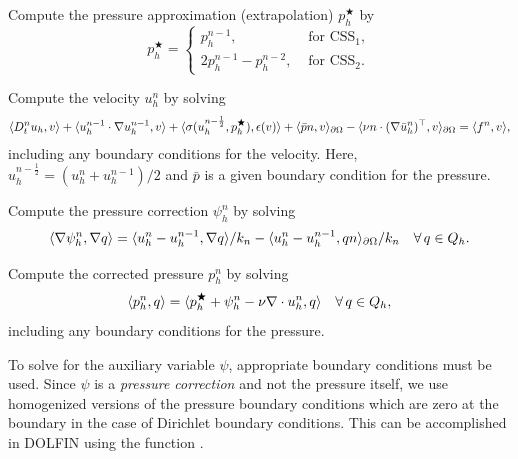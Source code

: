 {
\item
  Compute the pressure approximation (extrapolation)
  $p_h^{\bigstar}$ by
  \begin{equation}\label{eq:css,1a}
    p_h^{\bigstar} =
    \left\{
    \begin{array}{ll}
      p_h^{n-1}, & \mbox{ for } \mathrm{CSS}_1, \\
      2 p_h^{n-1} - p_h^{n-2}, & \mbox{ for } \mathrm{CSS}_2.
    \end{array}
    \right.
  \end{equation}

\item
  Compute the velocity $u_h^n$ by solving
  \begin{equation}\label{eq:css,2}
    \begin{split}
      \renni{v}{D_t^n u_h}
      + \renni{v}{u_h^{n-1} \cdot \nabla u_h^{n-1}}
      + \renni{\epsilon(v)}{\sigma(u^{n-\frac{1}{2}}_h, p_h^{\bigstar})}
      + \renni{v}{\bar{p} n}_{\partial\Omega}
      - \renni{v}{\nu n \cdot (\nabla \bar{u}_h^n)^{\top}}_{\partial\Omega}
      = \renni{v}{f^n},
    \end{split}
  \end{equation}
  including any boundary conditions for the velocity. Here,
  $u^{n-\frac{1}{2}}_h = (u_h^n + u_h^{n-1}) / 2$ and $\bar{p}$ is a given
  boundary condition for the pressure.

\item
  Compute the pressure correction $\psi_h^n$ by solving
  \begin{equation}\label{eq:css,3}
    \renni{\nabla q}{\nabla \psi_h^n}
    = \renni{\nabla q}{u_h^n - u_h^{n-1}} / k_n
    - \renni{qn}{u_h^n - u_h^{n-1}}_{\partial\Omega} / k_n
    \quad \foralls q \in Q_h.
  \end{equation}

\item
  Compute the corrected pressure $p_h^n$ by solving
  \begin{equation}\label{eq:css,4}
    \renni{q}{p_h^n} = \renni{q}{p_h^{\bigstar} + \psi_h^n - \nu \nabla \cdot u_h^n}
    \quad \foralls q \in Q_h,
  \end{equation}
  including any boundary conditions for the pressure.
}

To solve for the auxiliary variable $\psi$, appropriate boundary
conditions must be used. Since $\psi$ is a \emph{pressure correction}
and not the pressure itself, we use homogenized versions of the
pressure boundary conditions which are zero at the boundary in the
case of Dirichlet boundary conditions. This can be accomplished in
DOLFIN using the function .

